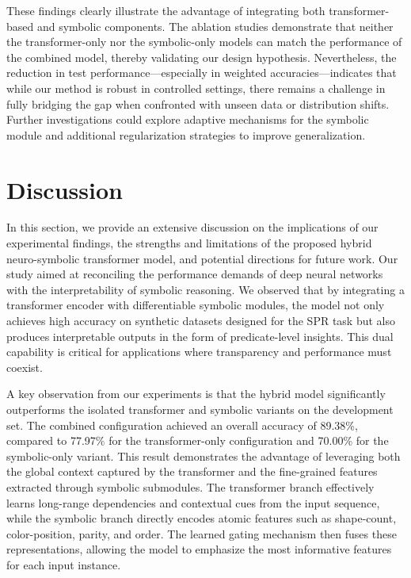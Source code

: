 \documentclass{article}
\begin{document}
These findings clearly illustrate the advantage of integrating both transformer-based and symbolic components. The ablation studies demonstrate that neither the transformer-only nor the symbolic-only models can match the performance of the combined model, thereby validating our design hypothesis. Nevertheless, the reduction in test performance—especially in weighted accuracies—indicates that while our method is robust in controlled settings, there remains a challenge in fully bridging the gap when confronted with unseen data or distribution shifts. Further investigations could explore adaptive mechanisms for the symbolic module and additional regularization strategies to improve generalization.

\section{Discussion}
In this section, we provide an extensive discussion on the implications of our experimental findings, the strengths and limitations of the proposed hybrid neuro-symbolic transformer model, and potential directions for future work. Our study aimed at reconciling the performance demands of deep neural networks with the interpretability of symbolic reasoning. We observed that by integrating a transformer encoder with differentiable symbolic modules, the model not only achieves high accuracy on synthetic datasets designed for the SPR task but also produces interpretable outputs in the form of predicate-level insights. This dual capability is critical for applications where transparency and performance must coexist.

A key observation from our experiments is that the hybrid model significantly outperforms the isolated transformer and symbolic variants on the development set. The combined configuration achieved an overall accuracy of 89.38\%, compared to 77.97\% for the transformer-only configuration and 70.00\% for the symbolic-only variant. This result demonstrates the advantage of leveraging both the global context captured by the transformer and the fine-grained features extracted through symbolic submodules. The transformer branch effectively learns long-range dependencies and contextual cues from the input sequence, while the symbolic branch directly encodes atomic features such as shape-count, color-position, parity, and order. The learned gating mechanism then fuses these representations, allowing the model to emphasize the most informative features for each input instance.
\end{document}
